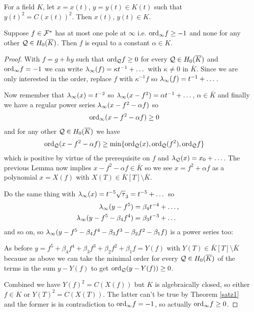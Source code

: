 \documentclass[english,11pt,a4paper]{article}
\begin{document}
\begin{theorem}\label{satz1}
  For a field $K$, let $x = x(t)$, $y = y(t) \in K(t)$ such that $y(t)^2 = C(x(t))^2$. Then $x(t)$, $y(t) \in K$.
\end{theorem}

\begin{lemma}\label{onepol}
	Suppose $f \in \mathcal{F}^*$ has at most one pole at $\infty$ i.e. $\text{ord}_{\infty} f \geq -1$ and none for any other $\mathcal{Q} \in H_0(\overline K)$. Then $f$ is equal to a constant $\alpha \in K$.

	\begin{proof}
		With $f = g+hy$ such that $\text{ord}_{\mathcal{Q}} f \geq 0$ for every $\mathcal{Q} \in H_0(\overline K)$ and $\text{ord}_{\infty} f = -1$ we can write $\lambda_{\infty} (f) = \kappa t^{-1} + \dots$ with $\kappa \neq 0$ in $\bar K$. Since we are only interested in the order, replace $f$ with $\kappa^{-1} f$ so $\lambda_{\infty} (f) = t^{-1} + \dots$.

		Now remember that $\lambda_{\infty} (x) = t^{-2}$ so $\lambda_{\infty} (x - f^2) = \alpha t^{-1} + \dots$, $\alpha \in \bar K$ and finally we have a regular power series $\lambda_{\infty} (x - f^2 - \alpha f)$ so
		\begin{align*}
		  \text{ord}_{\infty} (x - f^2 - \alpha f) &\geq 0
		\end{align*}
		and for any other $\mathcal{Q} \in H_0(\overline K)$ we have
		\begin{align*}
		  \text{ord}_{\mathcal{Q}} (x - f^2 - \alpha f) &\geq \min \{ \text{ord}_{\mathcal{Q}} (x) , \text{ord}_{\mathcal{Q}} (f^2) , \text{ord}_{\mathcal{Q}} f \}
		\end{align*}
		which is positive by virtue of the prerequisite on $f$ and $\lambda_{\mathcal{Q}}(x) = x_0 + \dots$. The previous Lemma now implies $x - f^2 - \alpha f \in \bar K$ so we see $x = f^2 + \alpha f$ as a polynomial $x = X(f)$ with $X(T) \in \bar K[T] \setminus \bar K$.

		Do the same thing with $\lambda_{\infty} (x) = t^{-5}\sqrt \tau_3 = t^{-5} + \dots$ so
		\begin{align*}
		  \lambda_{\infty} (y - f^5) &= \beta_4 t^{-4} + \dots,\\
		  \lambda_{\infty} (y - f^5 - \beta_4 f^4) &= \beta_3 t^{-3} + \dots
		\end{align*}
		and so on, so $\lambda_{\infty} (y - f^5 - \beta_4 f^4 - \beta_3 f^3 - \beta_2 f^2 - \beta_1 f)$ is a power series too:

		As before $y = f^5 + \beta_4 f^4 + \beta_3 f^3 + \beta_2 f^2 + \beta_1 f = Y(f)$ with $Y(T)\in \bar K[T] \setminus \bar K$
		because as above we can take the minimal order for every $\mathcal{Q} \in H_0(\overline K)$ of the terms in the sum $y - Y(f)$ to get $\text{ord}_{\mathcal{Q}} (y - Y(f)) \geq 0$.
		

		Combined we have $Y(f)^2 = C(X(f))$ but $K$ is algebraically closed, so either $f \in K$ or $Y(T)^2 = C(X(T))$. The latter can't be true by Theorem \ref{satz1} and the former is in contradiction to $\text{ord}_{\infty} f = -1$, so actually $\text{ord}_{\infty} f \geq 0$.%
	\end{proof}
\end{lemma}
\end{document}
